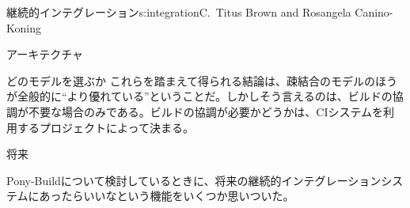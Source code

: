 \begin{aosachapter}{継続的インテグレーション}{s:integration}{C.\ Titus Brown and Rosangela Canino-Koning}
\begin{aosasect1}{アーキテクチャ}
\begin{aosasect2}{どのモデルを選ぶか}
これらを踏まえて得られる結論は、疎結合のモデルのほうが全般的に``より優れている''ということだ。しかしそう言えるのは、ビルドの協調が不要な場合のみである。ビルドの協調が必要かどうかは、CIシステムを利用するプロジェクトによって決まる。

\end{aosasect2}

\end{aosasect1}

\begin{aosasect1}{将来}

Pony-Buildについて検討しているときに、将来の継続的インテグレーションシステムにあったらいいなという機能をいくつか思いついた。

\begin{aosadescription}


\end{aosadescription}
\end{aosasect1}
\end{aosachapter}
